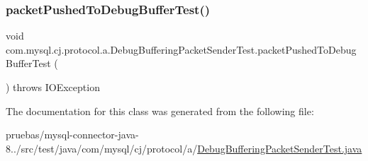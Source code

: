 \subsubsection{\texorpdfstring{packet\+Pushed\+To\+Debug\+Buffer\+Test()}{packetPushedToDebugBufferTest()}}
{\footnotesize\ttfamily void com.\+mysql.\+cj.\+protocol.\+a.\+Debug\+Buffering\+Packet\+Sender\+Test.\+packet\+Pushed\+To\+Debug\+Buffer\+Test (\begin{DoxyParamCaption}{ }\end{DoxyParamCaption}) throws I\+O\+Exception}



The documentation for this class was generated from the following file\+:\begin{DoxyCompactItemize}
\item 
pruebas/mysql-\/connector-\/java-\/8../src/test/java/com/mysql/cj/protocol/a/\mbox{\hyperlink{_debug_buffering_packet_sender_test_8java}{Debug\+Buffering\+Packet\+Sender\+Test.\+java}}\end{DoxyCompactItemize}
